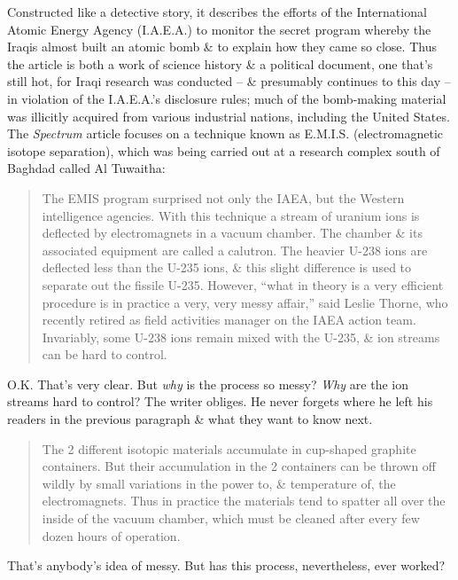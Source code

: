 \documentclass{article}
\begin{document}
Constructed like a detective story, it describes the efforts of the International Atomic Energy Agency (I.A.E.A.) to monitor the secret program whereby the Iraqis almost built an atomic bomb \& to explain how they came so close. Thus the article is both a work of science history \& a political document, one that's still hot, for Iraqi research was conducted -- \& presumably continues to this day -- in violation of the I.A.E.A.'s disclosure rules; much of the bomb-making material was illicitly acquired from various industrial nations, including the United States. The \textit{Spectrum} article focuses on a technique known as E.M.I.S. (electromagnetic isotope separation), which was being carried out at a research complex south of Baghdad called Al Tuwaitha:
\begin{quotation}
	The EMIS program surprised not only the IAEA, but the Western intelligence agencies. With this technique a stream of uranium ions is deflected by electromagnets in a vacuum chamber. The chamber \& its associated equipment are called a calutron. The heavier U-238 ions are deflected less than the U-235 ions, \& this slight difference is used to separate out the fissile U-235. However, ``what in theory is a very efficient procedure is in practice a very, very messy affair,'' said Leslie Thorne, who recently retired as field activities manager on the IAEA action team. Invariably, some U-238 ions remain mixed with the U-235, \& ion streams can be hard to control.
\end{quotation}
O.K. That's very clear. But \textit{why} is the process so messy? \textit{Why} are the ion streams hard to control? The writer obliges. He never forgets where he left his readers in the previous paragraph \& what they want to know next.
\begin{quotation}
	The 2 different isotopic materials accumulate in cup-shaped graphite containers. But their accumulation in the 2 containers can be thrown off wildly by small variations in the power to, \& temperature of, the electromagnets. Thus in practice the materials tend to spatter all over the inside of the vacuum chamber, which must be cleaned after every few dozen hours of operation.
\end{quotation}
That's anybody's idea of messy. But has this process, nevertheless, ever worked?
\end{document}
